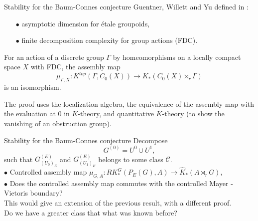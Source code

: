 \begin{frame}{Stability for the Baum-Connes conjecture}
Guentner, Willett and Yu defined in \cite{GWY}:
\begin{itemize}
\item[$\bullet$] asymptotic dimension for \'etale groupoids,
\item[$\bullet$] finite decomposition complexity for group actions (FDC). 
\end{itemize}

\begin{thmfr}
For an action of a discrete group $\Gamma$ by homeomorphisms on a locally compact space $X$ with FDC, the assembly map
\[\mu_{\Gamma,X} : K^{top}(\Gamma,C_0(X))\rightarrow K_*(C_0(X)\rtimes_r \Gamma)\]
is an isomorphism.
\end{thmfr}

The proof uses the localization algebra, the equivalence of the assembly map with the evaluation at $0$ in $K$-theory, and quantitative $K$-theory (to show the vanishing of an obstruction group).
\end{frame}

\begin{frame}{Stability for the Baum-Connes conjecture}
Decompose \[G^{(0)} = U^0 \cup U^1, \]
such that $G_{(U_0)	_E}^{(E)}$ and $G_{(U_1)_E}^{(E)}$ belongs to some class $\mathcal C$.\\
\vspace{0.3in}
$\bullet$ Controlled assembly map $\mu_{G,A}: RK_*^G(P_E(G), A) \rightarrow \hat K_*(A\rtimes_r G)$,\\
\vspace{0.3in}
$\bullet$ Does the controlled assembly map commutes with the controlled Mayer -Vietoris boundary?\\ This would give an extension of the previous result, with a different proof.\\
Do we have a greater class that what was known before?
\end{frame}